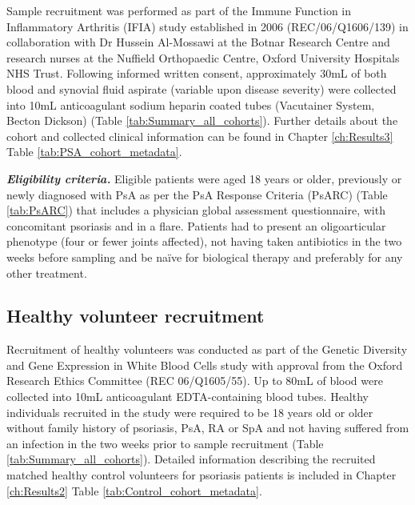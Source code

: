 Sample recruitment was performed as part of the Immune Function in Inflammatory Arthritis (IFIA) study established in 2006 (REC/06/Q1606/139) in collaboration with Dr Hussein Al-Mossawi at the Botnar Research Centre and research nurses at the Nuffield Orthopaedic Centre, Oxford University Hospitals NHS Trust. Following informed written consent, approximately 30mL of both blood and synovial fluid aspirate (variable upon disease severity) were collected into 10mL anticoagulant sodium heparin coated tubes (Vacutainer System, Becton Dickson) (Table \ref{tab:Summary_all_cohorts}). Further details about the cohort and collected clinical information can be found in Chapter \ref{ch:Results3} Table \ref{tab:PSA_cohort_metadata}.

\textbf{\textit{Eligibility criteria.}} Eligible patients were aged 18 years or older, previously or newly diagnosed with PsA as per the PsA Response Criteria (PsARC) (Table \ref{tab:PsARC}) that includes a physician global assessment questionnaire, with concomitant psoriasis and in a flare. Patients had to present an oligoarticular phenotype (four or fewer joints affected), not having taken antibiotics in the two weeks before sampling and be na\"{i}ve for biological therapy and preferably for any other treatment.    


\subsection{Healthy volunteer recruitment}
Recruitment of healthy volunteers was conducted as part of the Genetic Diversity and Gene Expression in White Blood Cells study with approval from the Oxford Research Ethics Committee (REC 06/Q1605/55). Up to 80mL of blood were collected into 10mL anticoagulant EDTA-containing blood tubes. Healthy individuals recruited in the study were required to be 18 years old or older without family history of psoriasis, PsA, RA or SpA and not having suffered from an infection in the two weeks prior to sample recruitment (Table \ref{tab:Summary_all_cohorts}). Detailed information describing the recruited matched healthy control volunteers for psoriasis patients is included in Chapter \ref{ch:Results2} Table \ref{tab:Control_cohort_metadata}.


